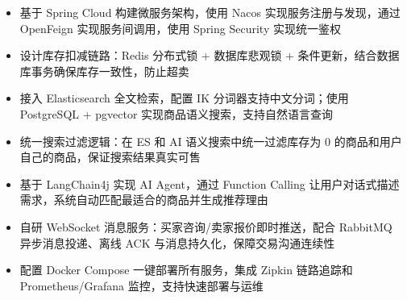 \begin{itemize}[leftmargin=*]
	\item 基于 Spring Cloud 构建微服务架构，使用 Nacos 实现服务注册与发现，通过 OpenFeign 实现服务间调用，使用 Spring Security 实现统一鉴权
	\item 设计库存扣减链路：Redis 分布式锁 + 数据库悲观锁 + 条件更新，结合数据库事务确保库存一致性，防止超卖
	\item 接入 Elasticsearch 全文检索，配置 IK 分词器支持中文分词；使用 PostgreSQL + pgvector 实现商品语义搜索，支持自然语言查询
	\item 统一搜索过滤逻辑：在 ES 和 AI 语义搜索中统一过滤库存为 0 的商品和用户自己的商品，保证搜索结果真实可售
	\item 基于 LangChain4j 实现 AI Agent，通过 Function Calling 让用户对话式描述需求，系统自动匹配最适合的商品并生成推荐理由
	\item 自研 WebSocket 消息服务：买家咨询/卖家报价即时推送，配合 RabbitMQ 异步消息投递、离线 ACK 与消息持久化，保障交易沟通连续性
	\item 配置 Docker Compose 一键部署所有服务，集成 Zipkin 链路追踪和 Prometheus/Grafana 监控，支持快速部署与运维
\end{itemize}

